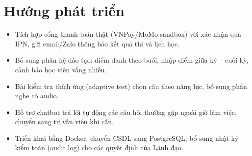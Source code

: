 \section{Hướng phát triển}
\begin{itemize}
  \item Tích hợp cổng thanh toán thật (VNPay/MoMo sandbox) với xác nhận qua IPN, gửi email/Zalo thông báo kết quả thi và lịch học.
  \item Bổ sung phân hệ đào tạo: điểm danh theo buổi, nhập điểm giữa kỳ – cuối kỳ, cảnh báo học viên vắng nhiều.
  \item Bài kiểm tra thích ứng (adaptive test) chọn câu theo năng lực, bổ sung phần nghe có audio.
  \item Hỗ trợ chatbot trả lời tự động các câu hỏi thường gặp ngoài giờ làm việc, chuyển sang tư vấn viên khi cần.
  \item Triển khai bằng Docker, chuyển CSDL sang PostgreSQL; bổ sung nhật ký kiểm toán (audit log) cho các quyết định của Lãnh đạo.
\end{itemize}
